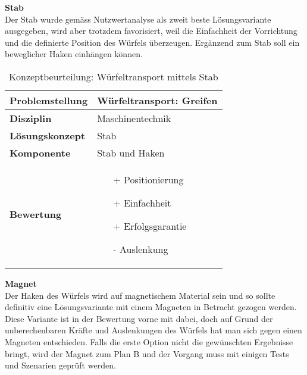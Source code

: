 \documentclass[../../main.tex]{subfiles}
\begin{document}
     \textbf{Stab}\\
 Der Stab wurde gemäss Nutzwertanalyse als zweit beste Lösungsvariante ausgegeben, wird aber trotzdem favorisiert, weil die Einfachheit der Vorrichtung und die definierte Position des Würfels überzeugen. Ergänzend zum Stab soll ein beweglicher Haken einhängen können. \\
\begin{flushleft}
    \begin{table}[h]
    \begin{tabular}{ | l | p{11cm} |}
    \hline
    \textbf{Problemstellung} & Würfeltransport: Greifen \\ \hline
    \textbf{Disziplin} & Maschinentechnik \\ \hline
    \textbf{Lösungskonzept} &  Stab \\ \hline
    \textbf{Komponente} & Stab und Haken \\ \hline
    \textbf{Bewertung} &  \begin{itemize}
                            \item[+] Positionierung
                            \item[+] Einfachheit
                            \item[+] Erfolgsgarantie 
                            \item[-] Auslenkung
                          \end{itemize} \\ \hline
    \end{tabular}
    \caption{Konzeptbeurteilung: Würfeltransport mittels Stab}
    \label{tab:konzept_wurfeltransport_stab}
\end{table}
\end{flushleft}

\textbf{Magnet}\\
 Der Haken des Würfels wird auf magnetischem Material sein und so sollte definitiv eine Lösungsvariante mit einem Magneten in Betracht gezogen werden. Diese Variante ist in der Bewertung vorne mit dabei, doch auf Grund der unberechenbaren Kräfte und Auslenkungen des Würfels hat man sich gegen einen Magneten entschieden. Falls die erste Option nicht die gewünschten Ergebnisse bringt, wird der Magnet zum Plan B und der Vorgang muss mit einigen Tests und Szenarien geprüft werden. \\
\end{document}
